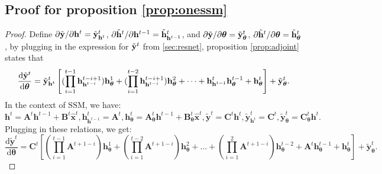 \documentclass{article}
\newtheorem{proof}{Proof}
\newcommand{\ssm}{\mathrm{SSM}}
\newcommand{\diff}{\mathrm{d}}
\begin{document}
\subsection{Proof for proposition \ref{prop:onessm}}
\label{sec:proofOnessm}
\begin{proof}
\label{proof:onessm}
    Define $\partial \Tilde{\mathbf{y}}/\partial \mathbf{h}^t=\Tilde{\mathbf{y}}^t_{\mathbf{h}^t}$, $\partial \Tilde{\mathbf{h}}^t/\partial \mathbf{h}^{t-1}=\Tilde{\mathbf{h}}^t_{\mathbf{h}^{t-1}}$, and $\partial \Tilde{\mathbf{y}}/\partial \boldsymbol{\theta}=\Tilde{\mathbf{y}}^t_{\boldsymbol{\theta}}$, $\partial \Tilde{\mathbf{h}}^t/\partial \boldsymbol{\theta}=\Tilde{\mathbf{h}}^t_{\boldsymbol{\theta}}$, by plugging in the expression for $\Tilde{\mathbf{y}}^t$ from \autoref{sec:resnet}, proposition \ref{prop:adjoint} states that 
\begin{equation*}
    \frac{\diff \Tilde{\mathbf{y}}^t}{\diff \boldsymbol{\theta}} = \Tilde{\mathbf{y}}^t_{\mathbf{h}^t} \left[ (\prod_{i=1}^{t-1}\mathbf{h}^{t-i+1}_{\mathbf{h}^{t-i}})\mathbf{h}^1_{\boldsymbol{\theta}}+(\prod_{i=1}^{t-2}\mathbf{h}^{t-i+1}_{\mathbf{h}^{t-i}})\mathbf{h}^2_{\boldsymbol{\theta}}+\dots+\mathbf{h}^t_{\mathbf{h}^{t-1}}\mathbf{h}^{t-1}_{\boldsymbol{\theta}}+\mathbf{h}^t_{\boldsymbol{\theta}} \right] +\Tilde{\mathbf{y}}^t_{\boldsymbol{\theta}}.
\end{equation*}
In the context of $\ssm$, we have:
\begin{equation}
    \mathbf{h}^t=\mathbf{A}^t\mathbf{h}^{t-1}+\mathbf{B}^t\hat{\mathbf{x}}^t, \mathbf{h}^t_{\mathbf{h}^{t-1}} = \mathbf{A}^t, \mathbf{h}^t_{\boldsymbol{\theta}}=\mathbf{A}^t_{\boldsymbol{\theta}}\mathbf{h}^{t-1}+\mathbf{B}^t_{\boldsymbol{\theta}}\hat{\mathbf{x}}^t, \tilde{\mathbf{y}}^t=\mathbf{C}^t\mathbf{h}^t, \tilde{\mathbf{y}}^t_{\mathbf{h}^t}=\mathbf{C}^t, \tilde{\mathbf{y}}^t_{\boldsymbol{\theta}}=\mathbf{C}^t_{\boldsymbol{\theta}}\mathbf{h}^t.
\end{equation}
Plugging in these relations, we get:
\begin{equation}
    \frac{\diff \tilde{\mathbf{y}}^t}{\diff\boldsymbol{\theta}} = \mathbf{C}^t \left[ (\prod_{i=1}^{t-1}\mathbf{A}^{t+1-i})\mathbf{h}^1_{\boldsymbol{\theta}}+(\prod_{i=1}^{t-2}\mathbf{A}^{t+1-i})\mathbf{h}^2_{\boldsymbol{\theta}}+\dots+(\prod_{i=1}^2\mathbf{A}^{t+1-i})\mathbf{h}^{t-2}_{\boldsymbol{\theta}}+\mathbf{A}^t\mathbf{h}^{t-1}_{\boldsymbol{\theta}}+\mathbf{h}^t_{\boldsymbol{\theta}} \right] +\tilde{\mathbf{y}}^t_{\boldsymbol{\theta}}.
\end{equation}


\end{proof}
\end{document}
